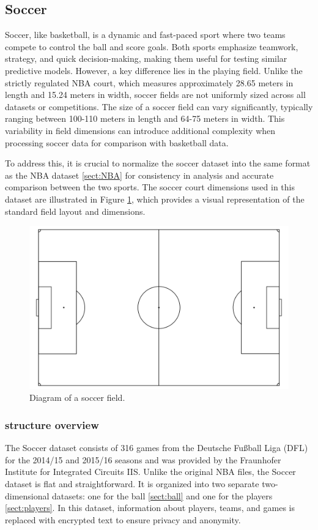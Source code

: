 \subsection{Soccer}
\label{sect:SOC}
Soccer, like basketball, is a dynamic and fast-paced sport where two teams compete to control the ball and score goals. Both sports emphasize teamwork, strategy, and quick decision-making, making them useful for testing similar predictive models. However, a key difference lies in the playing field. Unlike the strictly regulated NBA court, which measures approximately 28.65 meters in length and 15.24 meters in width, soccer fields are not uniformly sized across all datasets or competitions. The size of a soccer field can vary significantly, typically ranging between 100-110 meters in length and 64-75 meters in width. This variability in field dimensions can introduce additional complexity when processing soccer data for comparison with basketball data.

To address this, it is crucial to normalize the soccer dataset into the same format as the NBA dataset \ref{sect:NBA} for consistency in analysis and accurate comparison between the two sports. The soccer court dimensions used in this dataset are illustrated in Figure \ref{fig:soccer_court}, which provides a visual representation of the standard field layout and dimensions.

\begin{figure}[t]
    \centering
    \includegraphics[width=\textwidth]{contents/drawing_rg.png}
    \caption{Diagram of a soccer field.}
    \label{fig:soccer_court}
\end{figure}



\subsubsection{structure overview}
\label{soc:details}
The Soccer dataset consists of 316 games from the Deutsche Fu{\ss}ball Liga (DFL) for the 2014/15 and 2015/16 seasons and was provided by the Fraunhofer Institute for Integrated Circuits IIS. Unlike the original NBA files, the Soccer dataset is flat and straightforward. It is organized into two separate two-dimensional datasets: one for the ball \ref{sect:ball} and one for the players \ref{sect:players}. In this dataset, information about players, teams, and games is replaced with encrypted text to ensure privacy and anonymity.

